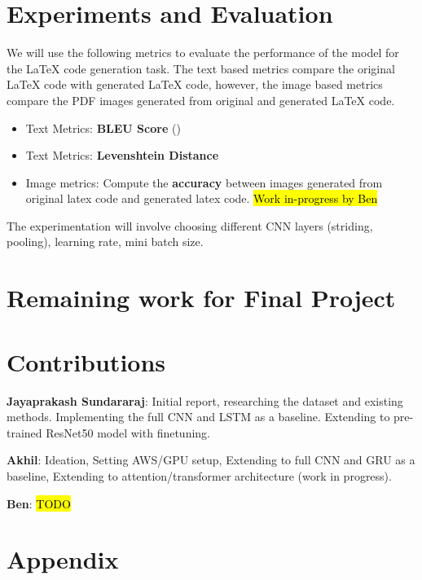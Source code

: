 \documentclass{article}
\newcommand{\hlblue}[1]{\hl{#1}}
\begin{document}
\section{Experiments and Evaluation}

We will use the following metrics to evaluate the performance of the model for the LaTeX code generation task. The text based metrics compare the original LaTeX code with generated LaTeX code, however, the image based metrics compare the PDF images generated from original and generated LaTeX code.

\begin{itemize}
    \item Text Metrics: \textbf{BLEU Score} (\cite{papineni-etal-2002-bleu})
    \item Text Metrics: \textbf{Levenshtein Distance}
    \item Image metrics: Compute the \textbf{accuracy} between images generated from original latex code and generated latex code. \hlblue{Work in-progress by Ben}
\end{itemize}

The experimentation will involve choosing different CNN layers (striding, pooling), learning rate, mini batch size. 

\section{Remaining work for Final Project}

\section{Contributions}

\textbf{Jayaprakash Sundararaj}: Initial report, researching the dataset and existing methods. Implementing the full CNN and LSTM as a baseline. Extending to pre-trained ResNet50 model with finetuning.

\textbf{Akhil}: Ideation, Setting AWS/GPU setup, Extending to full CNN and GRU as a baseline, Extending to attention/transformer architecture (work in progress).

\textbf{Ben}: \hlblue{TODO}


\medskip

\nocite{*}


\section{Appendix}
\end{document}
